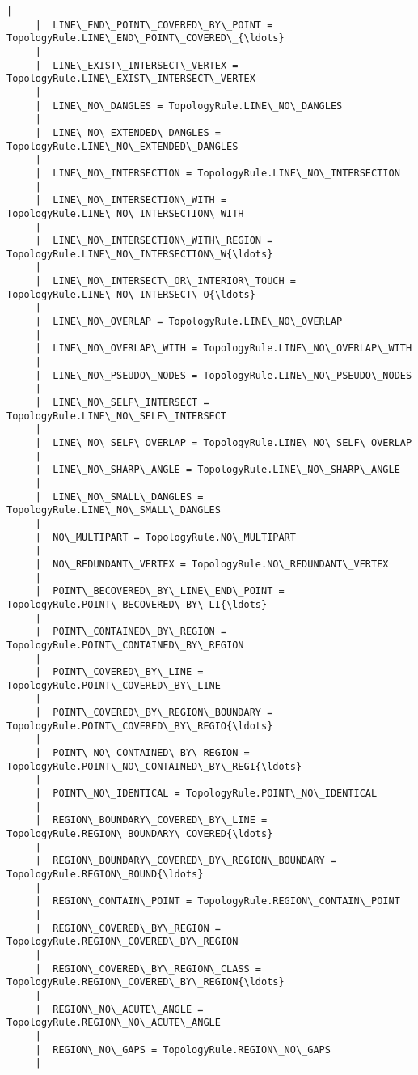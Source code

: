 \documentclass[11pt]{article}
\begin{document}
\begin{Verbatim}[commandchars=\\\{\}]
     |  
     |  LINE\_END\_POINT\_COVERED\_BY\_POINT = TopologyRule.LINE\_END\_POINT\_COVERED\_{\ldots}
     |  
     |  LINE\_EXIST\_INTERSECT\_VERTEX = TopologyRule.LINE\_EXIST\_INTERSECT\_VERTEX
     |  
     |  LINE\_NO\_DANGLES = TopologyRule.LINE\_NO\_DANGLES
     |  
     |  LINE\_NO\_EXTENDED\_DANGLES = TopologyRule.LINE\_NO\_EXTENDED\_DANGLES
     |  
     |  LINE\_NO\_INTERSECTION = TopologyRule.LINE\_NO\_INTERSECTION
     |  
     |  LINE\_NO\_INTERSECTION\_WITH = TopologyRule.LINE\_NO\_INTERSECTION\_WITH
     |  
     |  LINE\_NO\_INTERSECTION\_WITH\_REGION = TopologyRule.LINE\_NO\_INTERSECTION\_W{\ldots}
     |  
     |  LINE\_NO\_INTERSECT\_OR\_INTERIOR\_TOUCH = TopologyRule.LINE\_NO\_INTERSECT\_O{\ldots}
     |  
     |  LINE\_NO\_OVERLAP = TopologyRule.LINE\_NO\_OVERLAP
     |  
     |  LINE\_NO\_OVERLAP\_WITH = TopologyRule.LINE\_NO\_OVERLAP\_WITH
     |  
     |  LINE\_NO\_PSEUDO\_NODES = TopologyRule.LINE\_NO\_PSEUDO\_NODES
     |  
     |  LINE\_NO\_SELF\_INTERSECT = TopologyRule.LINE\_NO\_SELF\_INTERSECT
     |  
     |  LINE\_NO\_SELF\_OVERLAP = TopologyRule.LINE\_NO\_SELF\_OVERLAP
     |  
     |  LINE\_NO\_SHARP\_ANGLE = TopologyRule.LINE\_NO\_SHARP\_ANGLE
     |  
     |  LINE\_NO\_SMALL\_DANGLES = TopologyRule.LINE\_NO\_SMALL\_DANGLES
     |  
     |  NO\_MULTIPART = TopologyRule.NO\_MULTIPART
     |  
     |  NO\_REDUNDANT\_VERTEX = TopologyRule.NO\_REDUNDANT\_VERTEX
     |  
     |  POINT\_BECOVERED\_BY\_LINE\_END\_POINT = TopologyRule.POINT\_BECOVERED\_BY\_LI{\ldots}
     |  
     |  POINT\_CONTAINED\_BY\_REGION = TopologyRule.POINT\_CONTAINED\_BY\_REGION
     |  
     |  POINT\_COVERED\_BY\_LINE = TopologyRule.POINT\_COVERED\_BY\_LINE
     |  
     |  POINT\_COVERED\_BY\_REGION\_BOUNDARY = TopologyRule.POINT\_COVERED\_BY\_REGIO{\ldots}
     |  
     |  POINT\_NO\_CONTAINED\_BY\_REGION = TopologyRule.POINT\_NO\_CONTAINED\_BY\_REGI{\ldots}
     |  
     |  POINT\_NO\_IDENTICAL = TopologyRule.POINT\_NO\_IDENTICAL
     |  
     |  REGION\_BOUNDARY\_COVERED\_BY\_LINE = TopologyRule.REGION\_BOUNDARY\_COVERED{\ldots}
     |  
     |  REGION\_BOUNDARY\_COVERED\_BY\_REGION\_BOUNDARY = TopologyRule.REGION\_BOUND{\ldots}
     |  
     |  REGION\_CONTAIN\_POINT = TopologyRule.REGION\_CONTAIN\_POINT
     |  
     |  REGION\_COVERED\_BY\_REGION = TopologyRule.REGION\_COVERED\_BY\_REGION
     |  
     |  REGION\_COVERED\_BY\_REGION\_CLASS = TopologyRule.REGION\_COVERED\_BY\_REGION{\ldots}
     |  
     |  REGION\_NO\_ACUTE\_ANGLE = TopologyRule.REGION\_NO\_ACUTE\_ANGLE
     |  
     |  REGION\_NO\_GAPS = TopologyRule.REGION\_NO\_GAPS
     |  

\end{Verbatim}
\end{document}

